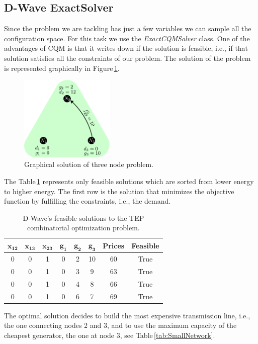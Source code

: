 \subsection{D-Wave ExactSolver}
Since the problem we are tackling has just a few variables we can sample all the configuration space. For this task we use the \textit{ ExactCQMSolver} class. One of the advantages of CQM is that it writes down if the solution is feasible, i.e.,  if that solution satisfies all the constraints of our problem. The solution of the problem is represented graphically in Figure\,\ref{fig: Green_final}.
\begin{figure}[H]
  \begin{center}
\includegraphics[width=0.4\textwidth]{Figures/Green_Final.pdf}
  \end{center}
  \caption{Graphical solution of three node problem.}
  \label{fig: Green_final}
\end{figure}
The Table\,\ref{tab:SmallNetworkResults} represents only feasible solutions which are sorted from lower energy to higher energy. The first row is the solution that minimizes the objective function by fulfilling the constraints, i.e., the demand.
 \begin{table}[H]
\centering
\begin{tabular}{ |c|c|c|c|c|c|c|c| }
  \hline			
  $\mathbf{x_{12}}$ & $\mathbf{x_{13}}$ & $\mathbf{x_{23}}$ & $\mathbf{g_{1}}$ & $\mathbf{g_{2}}$ & $\mathbf{g_{3}}$ & \textbf{Prices} & \textbf{Feasible} \\
  \hline
    0 & 0 & 1 & 0 & 2 & 10 & 60 & True \\
  \hline
    0 & 0 & 1 & 0 & 3 & 9 & 63 & True \\
  \hline
    0 & 0 & 1 & 0 & 4 & 8 & 66 & True \\
  \hline
    0 & 0 & 1 & 0 & 6 & 7 & 69 & True \\
  \hline
\end{tabular}
\caption{D-Wave's feasible solutions to the TEP combinatorial optimization problem.}
\label{tab:SmallNetworkResults}
\end{table}
The optimal solution decides to build the most expensive transmission line, i.e., the one connecting nodes 2 and 3, and to use the maximum capacity of the cheapest generator, the one at node 3, see Table\,\ref{tab:SmallNetwork}.

